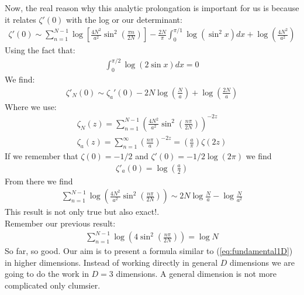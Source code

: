 \documentclass[12pt]{article}
\begin{document}
Now, the real reason why this analytic prolongation is important for us is because it relates $\zeta'(0)$ with the log or our determinant:
\begin{gather}
\zeta'(0)\sim \sum_{n=1}^{N-1}\log\left[\frac{4N^2}{a^2}\sin^2\left(\frac{\pi n}{2N}\right)\right]-\frac{2N}{\pi}\int_0^{\pi/1}\log ( \sin^2 x )dx+\log\left(\frac{4N^2}{a^2}\right)
\end{gather}
Using the fact that:
\begin{gather}
\int_0^{\pi/2}\log(2\sin x)dx=0
\end{gather}
We find:
\begin{gather}
\zeta'_N(0)\sim \zeta_a'(0)-2N\log\left(\frac{N}{a}\right)+\log\left(\frac{2N}{a}\right)\label{eq:fundamental1D}
\end{gather}
Where we use:
\begin{gather}
\zeta_N(z)=\sum_{n=1}^{N-1}\left(\frac{4N^2}{a^2}\sin^2\left(\frac{n\pi}{2N}\right)\right)^{-2z}\\
\zeta_a(z)=\sum_{n=1}^\infty \left(\frac{n\pi}{a}\right)^{-2z}=\left(\frac{a}{\pi}\right)\zeta(2z)
\end{gather}
If we remember that $\zeta(0)=-1/2$ and $\zeta'(0)=-1/2 \log(2\pi)$ we find
\begin{gather}
\zeta'_a(0)=\log\left(\frac{a}{2}\right)
\end{gather}
From there we find
\begin{gather}
\sum_{n=1}^{N-1}\log\left(\frac{4N^2}{a^2}\sin^2\left(\frac{n\pi}{2N}\right)\right)\sim 2N\log \frac{N}{a}-\log\frac{N}{a^2}
\end{gather}
This result is not only true but also exact!.\\
Remember our previous result:
\begin{gather}
\sum_{n=1}^{N-1}\log\left(4\sin^2\left(\frac{n\pi}{2N}\right)\right)=\log N
\end{gather}
So far, so good.
Our aim is to present a formula similar to (\ref{eq:fundamental1D}) in higher dimensions. Instead of working directly in general $D$ dimensions we are going to do the work in $D=3$ dimensions. A general dimension is not more complicated only clumsier.
\end{document}
